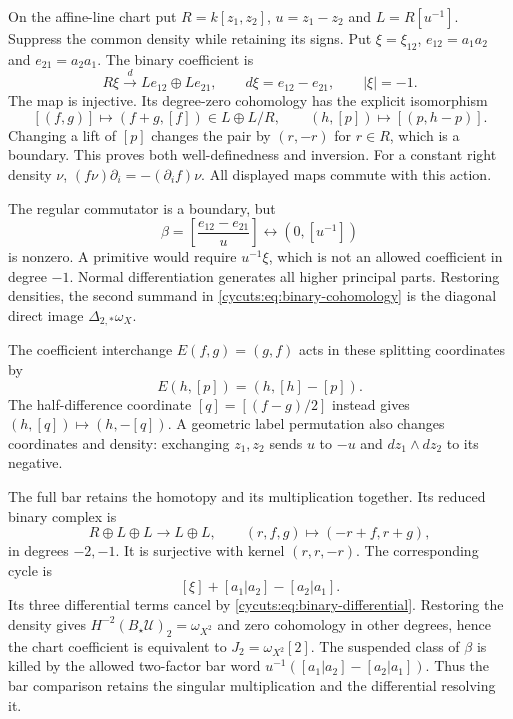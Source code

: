 On the affine-line chart put $R=k[z_1,z_2]$, $u=z_1-z_2$ and
$L=R[u^{-1}]$. Suppress the common density while retaining its signs.
Put $\xi=\xi_{12}$, $e_{12}=a_1a_2$ and $e_{21}=a_2a_1$.
The binary coefficient is
\begin{equation}\label{cycuts:eq:binary-complex}
 R\xi\xrightarrow{d}Le_{12}\oplus Le_{21},
 \qquad d\xi=e_{12}-e_{21},\qquad |\xi|=-1.
\end{equation}
The map is injective. Its degree-zero cohomology has the explicit
isomorphism
\begin{equation}\label{cycuts:eq:binary-cohomology}
 [(f,g)]\longmapsto(f+g,[f])\in L\oplus L/R,
 \qquad (h,[p])\longmapsto[(p,h-p)].
\end{equation}
Changing a lift of $[p]$ changes the pair by $(r,-r)$ for $r\in R$,
which is a boundary. This proves both well-definedness and inversion.
For a constant right density $\nu$,
$(f\nu)\partial_i=-(\partial_i f)\nu$. All displayed maps
commute with this action.

The regular commutator is a boundary, but
\begin{equation}\label{cycuts:eq:singular}
 \beta=\left[\frac{e_{12}-e_{21}}u\right]
       \longleftrightarrow(0,[u^{-1}])
\end{equation}
is nonzero. A primitive would require $u^{-1}\xi$, which is not
an allowed coefficient in degree $-1$. Normal differentiation generates
all higher principal parts. Restoring densities, the second summand
in \eqref{cycuts:eq:binary-cohomology} is the diagonal direct image
$\Delta_{2,*}\omega_X$.

The coefficient interchange $E(f,g)=(g,f)$ acts in these splitting
coordinates by
\[
 E(h,[p])=(h,[h]-[p]).
\]
The half-difference coordinate $[q]=[(f-g)/2]$ instead gives
$(h,[q])\mapsto(h,-[q])$. A geometric label permutation also
changes coordinates and density: exchanging $z_1,z_2$ sends $u$ to
$-u$ and $dz_1\wedge dz_2$ to its negative.

The full bar retains the homotopy and its multiplication together.
Its reduced binary complex is
\begin{equation}\label{cycuts:eq:binary-bar}
 R\oplus L\oplus L\longrightarrow L\oplus L,
 \qquad(r,f,g)\longmapsto(-r+f,r+g),
\end{equation}
in degrees $-2,-1$. It is surjective with kernel $(r,r,-r)$.
The corresponding cycle is
\[
 [\xi]+[a_1|a_2]-[a_2|a_1].
\]
Its three differential terms cancel by
\eqref{cycuts:eq:binary-differential}. Restoring the density gives
$H^{-2}(B_\star\mathscr U)_2=\omega_{X^2}$ and zero cohomology
in other degrees, hence the chart coefficient is equivalent to
$J_2=\omega_{X^2}[2]$.
The suspended class of $\beta$ is killed by the allowed two-factor
bar word $u^{-1}([a_1|a_2]-[a_2|a_1])$. Thus the bar comparison
retains the singular multiplication and the differential resolving it.

